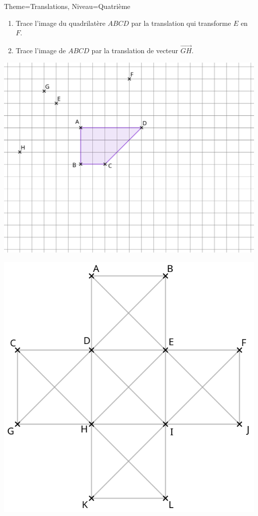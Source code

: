 \documentclass[11pt]{article}
\begin{document}
\begin{Maquette}[Fiche]{Theme=Translations, Niveau=Quatrième}
\begin{exercice}
    \begin{enumerate}
        \item Trace l’image du quadrilatère $ABCD$ par la translation qui transforme $E$ en $F$.
        \item Trace l’image de $ABCD$ par la translation de vecteur $\overrightarrow{GH}$.
    \end{enumerate}
    \begin{center}
        \includegraphics[width=.75\linewidth]{Images/exercice3.png}
    \end{center}
\end{exercice}

\newpage

\begin{multicols}{2}
    
\begin{exercice}
    \includegraphics[width=.95\linewidth]{Images/exercice4.png}


\end{exercice}
\end{multicols}
\end{Maquette}
\end{document}
